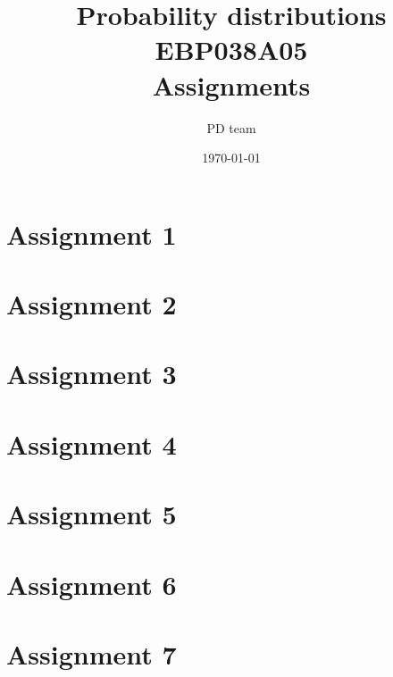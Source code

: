 \documentclass[a4paper,12pt]{article}
\author{PD team}
\date{\today}
\title{Probability distributions EBP038A05\\
Assignments}
\begin{document}
\maketitle
\tableofcontents






\section{Assignment 1}






\section{Assignment 2}





\section{Assignment 3}







\section{Assignment 4}






\section{Assignment 5}







\section{Assignment 6}






\section{Assignment 7}




\end{document}
